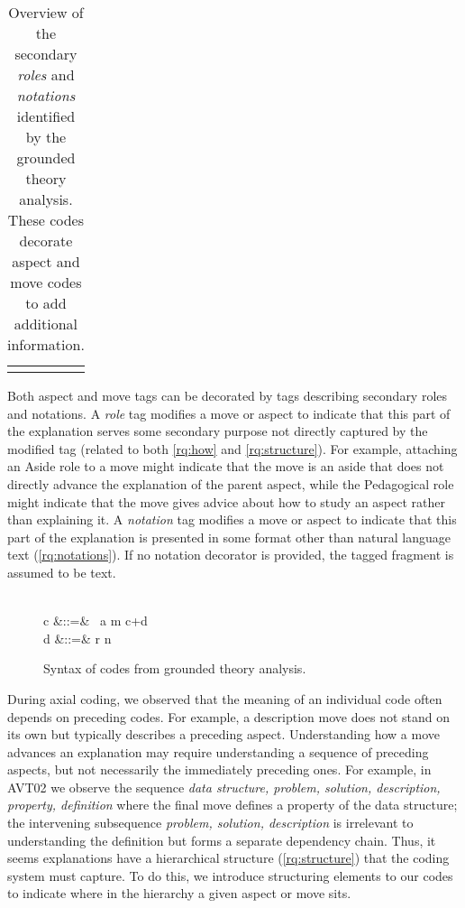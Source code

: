 \documentclass[sigconf]{acmart}
\newcommand{\OR}{\OB{\hspace{1.5ex}|\hspace{1.5ex}}}
\newcommand{\Push}{\OB{\Rightarrow}}
\newcommand{\Pop}{\OB{\Leftarrow}}
\begin{document}
\begin{table}
\begin{tabular}{ll}

\\[-1.5ex]

\\[-1.5ex]
\end{tabular}
\caption{Overview of the secondary \emph{roles} and \emph{notations} identified
by the grounded theory analysis. These codes decorate aspect and move codes to
add additional information.}
\label{tbl:codes:dec}
\vspace{-3ex}
\end{table}


Both aspect and move tags can be decorated by tags describing secondary roles
and notations.
%
A \emph{role} tag modifies a move or aspect to indicate that this part of the
explanation serves some secondary purpose not directly captured by the modified
tag (related to both \ref{rq:how} and \ref{rq:structure}). For example,
attaching an Aside role to a move might indicate that the move is an aside that
does not directly advance the explanation of the parent aspect, while the
Pedagogical role might indicate that the move gives advice about how to study
an aspect rather than explaining it.
%
A \emph{notation} tag modifies a move or aspect to indicate that this part of
the explanation is presented in some format other than natural language text
(\ref{rq:notations}). If no notation decorator is provided, the tagged fragment
is assumed to be text.


\begin{figure}
\begin{syntax}
 \\
c\in{}
 &::=& \Push~a
 \OR \!\Pop\!
 \OR m
 \OR c+d \\
d\in{}
 &::=& r \OR n
\end{syntax}
\vspace{-3ex}
\caption{Syntax of codes from grounded theory analysis.}
\label{fig:codes:syntax}
\vspace{-2ex}
\end{figure}


During axial coding, we observed that the meaning of an individual code often
depends on preceding codes. For example, a description move does not stand on
its own but typically describes a preceding aspect. 
%
Understanding how a move advances an explanation may require understanding a
sequence of preceding aspects, but not necessarily the immediately preceding
ones. For example, in AVT02 we observe the sequence \textit{data structure,
problem, solution, description, property, definition} where the final move
defines a property of the data structure; the intervening subsequence
\textit{problem, solution, description} is irrelevant to understanding the
definition but forms a separate dependency chain.
%
Thus, it seems explanations have a hierarchical structure (\ref{rq:structure})
that the coding system must capture. To do this, we introduce structuring
elements to our codes to indicate where in the hierarchy a given aspect or move
sits.
\end{document}
